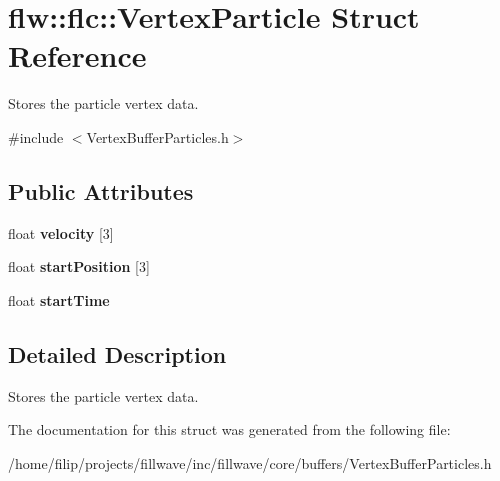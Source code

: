 \hypertarget{structflw_1_1flc_1_1VertexParticle}{}\section{flw\+:\+:flc\+:\+:Vertex\+Particle Struct Reference}
\label{structflw_1_1flc_1_1VertexParticle}


Stores the particle vertex data.  




{\ttfamily \#include $<$Vertex\+Buffer\+Particles.\+h$>$}

\subsection*{Public Attributes}
\begin{DoxyCompactItemize}
\item 
\mbox{\label{structflw_1_1flc_1_1VertexParticle_ad79a68ef6321fa9ef11a5cb4c954de88}} 
float {\bfseries velocity} \mbox{[}3\mbox{]}
\item 
\mbox{\label{structflw_1_1flc_1_1VertexParticle_a54b9be8e44ee4cbc59de2b1b95bb01fc}} 
float {\bfseries start\+Position} \mbox{[}3\mbox{]}
\item 
\mbox{\label{structflw_1_1flc_1_1VertexParticle_a41542fa766eee4186138b250a9c7a9cf}} 
float {\bfseries start\+Time}
\end{DoxyCompactItemize}


\subsection{Detailed Description}
Stores the particle vertex data. 

The documentation for this struct was generated from the following file\+:\begin{DoxyCompactItemize}
\item 
/home/filip/projects/fillwave/inc/fillwave/core/buffers/Vertex\+Buffer\+Particles.\+h\end{DoxyCompactItemize}
